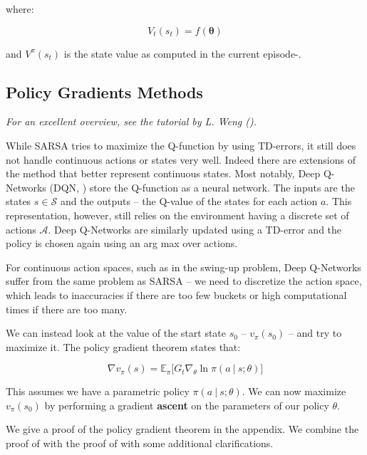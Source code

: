 \documentclass{article}
\newcommand{\bm}[1]{\mathbf{#1}}
\newcommand{\giv}{\ |\ }
\begin{document}
where:

\begin{equation*}
    V_t(s_t) = f(\bm{\theta})
\end{equation*}

and $V^\pi(s_t)$ is the state value as computed in the current episode-.


\subsection{Policy Gradients Methods}
    \textit{For an excellent overview, see the tutorial by L. Weng (\cite{policy_gradient_tutorial}).}

    While SARSA tries to maximize the Q-function by using TD-errors, it still does not handle continuous actions or states very well. Indeed there are extensions of the method that better represent continuous states. Most notably, Deep Q-Networks (DQN, \cite{mnih_playing_2013}) store the Q-function as a neural network. The inputs are the states $s \in \mathcal{S}$ and the outputs -- the Q-value of the states for each action $a$. This representation, however, still relies on the environment having a discrete set of actions $\mathcal{A}$. Deep Q-Networks are similarly updated using a TD-error and the policy is chosen again using an arg max over actions.

    For continuous action spaces, such as in the swing-up problem, Deep Q-Networks suffer from the same problem as SARSA -- we need to discretize the action space, which leads to inaccuracies if there are too few buckets or high computational times if there are too many.

    We can instead look at the value of the start state $s_0$ -- $v_\pi(s_0)$ -- and try to maximize it. The policy gradient theorem states that:
    
    \begin{equation} \label{eq:policy_grad}
        \nabla v_\pi(s) = \mathbb{E}_\pi \big[
            G_t \nabla_\theta \ln \pi(a \giv s; \theta)
        \big]
    \end{equation}

    This assumes we have a parametric policy $\pi(a \giv s; \theta)$. We can now maximize $v_\pi(s_0)$ by performing a gradient \textbf{ascent} on the parameters of our policy $\theta$.

    We give a proof of the policy gradient theorem in the appendix. We combine the proof of \cite[Chapter~13]{sutton_learning_1988} with the proof of \cite{policy_gradient_tutorial} with some additional clarifications.
\end{document}
